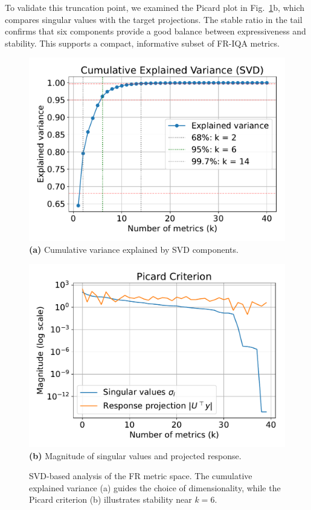 To validate this truncation point, we examined the Picard plot in Fig.~\ref{fig:svd_analysis}b, which compares singular values with the target projections. The stable ratio in the tail confirms that six components provide a good balance between expressiveness and stability. This supports a compact, informative subset of FR-IQA metrics.

\begin{figure}[ht]
    \centering
    \begin{minipage}[t]{0.48\textwidth}
        \centering
        \includegraphics[width=\linewidth]{images/variance.pdf}
        \textbf{(a)} Cumulative variance explained by SVD components.
    \end{minipage}
    \hfill
    \begin{minipage}[t]{0.48\textwidth}
        \centering
        \includegraphics[width=\linewidth]{images/picard.pdf}
        \textbf{(b)} Magnitude of singular values and projected response.
    \end{minipage}
    \caption{SVD-based analysis of the FR metric space. The cumulative explained variance (a) guides the choice of dimensionality, while the Picard criterion (b) illustrates stability near $k=6$.}\label{fig:svd_analysis}
\end{figure}

